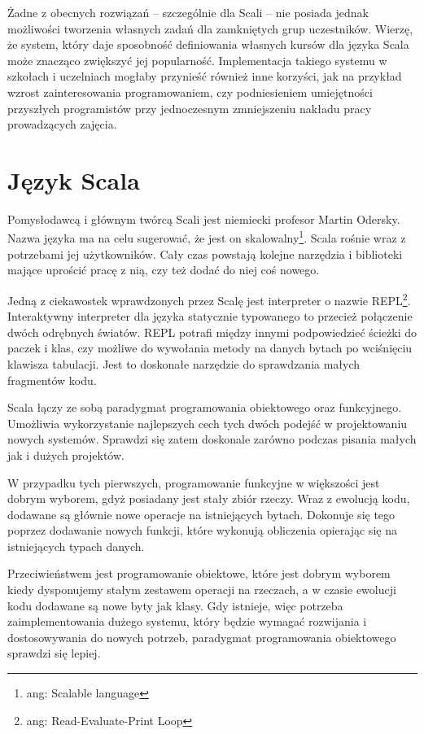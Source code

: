 \documentclass[brudnopis]{xmgr}
\begin{document}
Żadne z obecnych rozwiązań -- szczególnie dla Scali -- nie posiada jednak możliwości tworzenia własnych zadań dla zamkniętych grup uczestników. Wierzę, że system, który daje sposobność definiowania własnych kursów dla języka Scala może znacząco zwiększyć jej popularność. Implementacja takiego systemu w szkołach i uczelniach mogłaby przynieść również inne korzyści, jak na przykład wzrost zainteresowania programowaniem, czy podniesieniem umiejętności przyszłych programistów przy jednoczesnym zmniejszeniu nakładu pracy prowadzących zajęcia.

\section{Język Scala}

Pomysłodawcą i głównym twórcą Scali jest niemiecki profesor Martin Odersky. Nazwa języka ma na celu sugerować, że jest on skalowalny\footnote{ang: Scalable language}. Scala rośnie wraz z potrzebami jej użytkowników. Cały czas powstają kolejne narzędzia i biblioteki mające uprościć pracę z nią, czy też dodać do niej coś nowego. 

Jedną z ciekawostek wprawdzonych przez Scalę jest interpreter o nazwie REPL\footnote{ang: Read-Evaluate-Print Loop}. Interaktywny interpreter dla języka statycznie typowanego to przecież połączenie dwóch odrębnych światów. REPL potrafi między innymi podpowiedzieć ścieżki do paczek i klas, czy możliwe do wywołania metody na danych bytach po wciśnięciu klawisza tabulacji. Jest to doskonałe narzędzie do sprawdzania małych fragmentów kodu.

Scala łączy ze sobą paradygmat programowania obiektowego oraz funkcyjnego. Umożliwia wykorzystanie najlepszych cech tych dwóch podejść w projektowaniu nowych systemów. Sprawdzi się zatem doskonale zarówno podczas pisania małych jak i dużych projektów.

W przypadku tych pierwszych, programowanie funkcyjne w większości jest dobrym wyborem, gdyż posiadany jest stały zbiór rzeczy. Wraz z ewolucją kodu, dodawane są głównie nowe operacje na istniejących bytach. Dokonuje się tego poprzez dodawanie nowych funkcji, które wykonują obliczenia opierając się na istniejących typach danych. 

Przeciwieństwem jest programowanie obiektowe, które jest dobrym wyborem kiedy dysponujemy stałym zestawem operacji na rzeczach, a w czasie ewolucji kodu dodawane są nowe byty jak klasy. Gdy istnieje, więc potrzeba zaimplementowania dużego systemu, który będzie wymagać rozwijania i dostosowywania do nowych potrzeb, paradygmat programowania obiektowego sprawdzi się lepiej.
\end{document}
